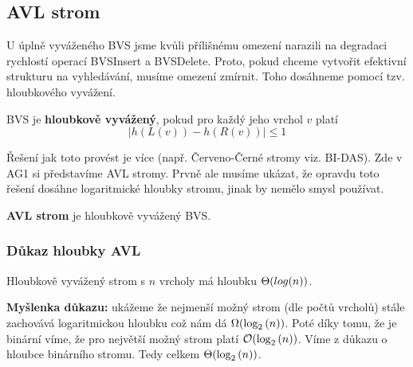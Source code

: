 
\subsection{AVL strom}

\noindent U úplně vyváženého BVS jsme kvůli přílišnému omezení narazili na degradaci rychlostí operací BVSInsert a BVSDelete. Proto, pokud chceme vytvořit efektivní strukturu na vyhledávání, musíme omezení zmírnit. Toho dosáhneme pomocí tzv. hloubkového vyvážení. \bigskip

\begin{definition}
    BVS je \textbf{hloubkově vyvážený}, pokud pro každý jeho vrchol $v$ platí 
    \[ \left| h(L(v)) - h(R(v)) \right| \leq 1 \]
\end{definition} \bigskip

\noindent Řešení jak toto provést je více (např. Červeno-Černé stromy viz. BI-DAS). Zde v AG1 si představíme AVL stromy. Prvně ale musíme ukázat, že opravdu toto řešení dosáhne logaritmické hloubky stromu, jinak by nemělo smysl používat. \bigskip

\begin{definition}
  \label{def:avl}
  \textbf{AVL strom} je hloubkově vyvážený BVS.
\end{definition}

\subsubsection{Důkaz hloubky AVL}

\begin{theorem}
    Hloubkově vyvážený strom s $n$ vrcholy má hloubku $\Theta(log(n))$.
\end{theorem} \medskip

\noindent \textbf{Myšlenka důkazu:} ukážeme že nejmenší možný strom (dle počtů vrcholů) stále zachovává logaritmickou hloubku což nám dá $\Omega(\log_2{(n)})$. Poté díky tomu, že je binární víme, že pro největší možný strom platí $\mathcal{O}(\log_2{(n)})$. Víme z důkazu o hloubce binárního stromu. Tedy celkem $\Theta(\log_2{(n)})$. \medskip

